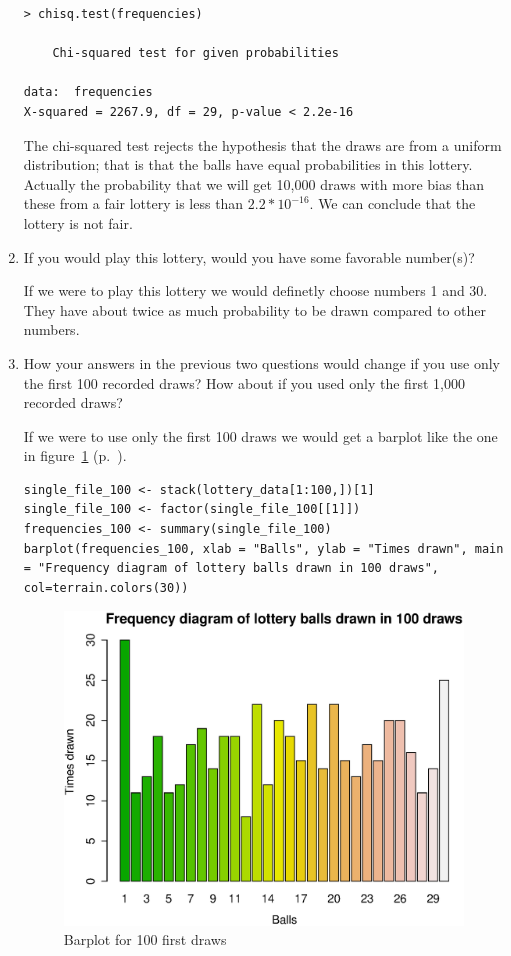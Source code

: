 \documentclass{article}
\begin{document}
\begin{enumerate}
  \begin{lstlisting}
> chisq.test(frequencies)

	Chi-squared test for given probabilities

data:  frequencies
X-squared = 2267.9, df = 29, p-value < 2.2e-16
  \end{lstlisting}
  
  The chi-squared test rejects the hypothesis that the draws are from a uniform
  distribution; that is that the balls have equal probabilities in this lottery.
  Actually the probability that we will get 10,000 draws with more bias 
  than these from a fair lottery is less than $2.2*10^{-16}$.
  We can conclude that the lottery is not fair.
  
  \item If you would play this lottery, would you have some favorable number(s)?
  
  If we were to play this lottery we would definetly choose numbers 1 and 30.
  They have about twice as much probability to be drawn compared to other
  numbers.
  
  \item How your answers in the previous two questions would change if you use
  only the first 100 recorded draws? How about if you used only the first 1,000
  recorded draws?
  
  If we were to use only the first 100 draws we would get a barplot like the one
  in figure~\ref{fig:barplot100} (p.~\pageref{fig:barplot100}).
  
  \begin{lstlisting}
single_file_100 <- stack(lottery_data[1:100,])[1]
single_file_100 <- factor(single_file_100[[1]])
frequencies_100 <- summary(single_file_100)
barplot(frequencies_100, xlab = "Balls", ylab = "Times drawn", main = "Frequency diagram of lottery balls drawn in 100 draws", col=terrain.colors(30))
  \end{lstlisting}
  
  \begin{figure}[H]
  \centering
  \includegraphics[scale=0.6]{barplot100.eps}
  \caption{Barplot for 100 first draws}
  \label{fig:barplot100}
  \end{figure}
  

\end{enumerate}
\end{document}
